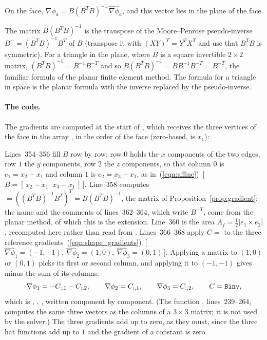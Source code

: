 \begin{prop}
\label{prop:gradient}
On the face, $\nabla \phi_a = B (B^T B)^{-1}\, \hat\nabla \hat\phi_a$, and this vector lies in the plane of the face.
\end{prop}
The matrix $B (B^T B)^{-1}$ is the transpose of the Moore--Penrose pseudo-inverse $B^+ = (B^T B)^{-1} B^T$ of $B$ (transpose it with $(XY)^T = Y^T X^T$ and use that $B^T B$ is symmetric). For a triangle in the plane, where $B$ is a square invertible $2\times 2$ matrix, $(B^T B)^{-1} = B^{-1} B^{-T}$ and so $B (B^T B)^{-1} = B B^{-1} B^{-T} = B^{-T}$, the familiar formula of the planar finite element method. The formula for a triangle in space is the planar formula with the inverse replaced by the pseudo-inverse.

\paragraph{The code.} The gradients are computed at the start of , which receives the three vertices of the face in the array , in the order of the face (zero-based,  is $x_1$):

Lines~354--356 fill $B$ row by row: row $0$ holds the $x$ components of the two edges, row $1$ the $y$ components, row $2$ the $z$ components, so that column $0$ is $e_1 = x_2 - x_1$ and column $1$ is $e_2 = x_3 - x_1$, as in~(\ref{eqn:affine})~[\,$B = [\,x_2 - x_1\;\;x_3 - x_1\,]$\,]. Line~358 computes  $= ((B^T B)^{-1} B^T)^T = B (B^T B)^{-1}$, the matrix of Proposition~\ref{prop:gradient}; the name and the comments of lines~362--364, which write $B^{-T}$, come from the planar method, of which this is the extension. Line~360 is the area $A_f = \frac12 |e_1 \times e_2|$, recomputed here rather than read from . Lines~366--368 apply $C = $  to the three reference gradients~(\ref{eqn:shape_gradients})~[\,$\hat\nabla\hat\phi_1 = (-1,-1),\ \hat\nabla\hat\phi_2 = (1,0),\ \hat\nabla\hat\phi_3 = (0,1)$\,]. Applying a matrix to $(1, 0)$ or $(0, 1)$ picks its first or second column, and applying it to $(-1, -1)$ gives minus the sum of its columns:
\begin{equation}
\label{eqn:gradN}
\nabla \phi_1 = -C_{:,1} - C_{:,2}, \qquad \nabla \phi_2 = C_{:,1}, \qquad \nabla \phi_3 = C_{:,2}, \qquad C = \texttt{Binv},
\end{equation}
which is , , , written component by component. (The function , lines~239--264, computes the same three vectors as the columns of a $3\times 3$ matrix; it is not used by the solver.) The three gradients add up to zero, as they must, since the three hat functions add up to $1$ and the gradient of a constant is zero.

